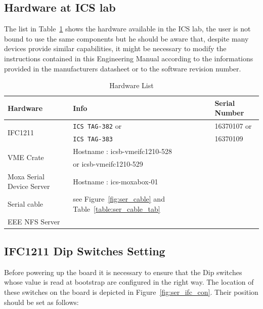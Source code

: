 \documentclass[11pt
  , a4paper
  , article
  , oneside
  , showtrims
]{memoir}
\begin{document}
\subsection{Hardware at ICS lab}
The list in Table~\ref{table:hwlist_ics} shows the hardware available in the ICS lab, the user is not bound to use the same components but he should be aware that, despite many devices provide similar capabilities, it might be necessary to modify the instructions contained in this Engineering Manual according to the informations provided in the manufacturers datasheet or to the software revision number.

\begin{table}[!hb]
  \centering
  \begin{tabular}{l|l|l}
    \toprule
    Hardware                  & Info                                                               & Serial Number              \\\midrule
    \multicolumn{1}{l|}{\multirow{2}{*}{IFC1211}}  & \texttt{ICS TAG-382} or                       & 16370107 or                \\
    \multicolumn{1}{l|}{}     & \texttt{ICS TAG-383}                                               & 16370109                   \\\midrule
    \multicolumn{1}{l|}{\multirow{2}{*}{VME Crate}}& Hostname : icsb-vmeifc1210-528                &                            \\
    \multicolumn{1}{l|}{}     & or icsb-vmeifc1210-529                                             &                            \\\midrule
    Moxa Serial Device Server & Hostname : ics-moxabox-01                                          &                            \\\midrule
    Serial cable              & see Figure~\ref{fig:ser_cable} and Table~\ref{table:ser_cable_tab} &                            \\\midrule
    EEE NFS Server            &                             &    \\\bottomrule
  \end{tabular}
  \caption[]{Hardware List}
  \label{table:hwlist_ics}
\end{table}
\FloatBarrier

\subsection{IFC1211 Dip Switches Setting}
Before powering up the board it is necessary to ensure that the Dip switches whose value is read at bootstrap are configured in the right way.
The location of these switches on the board is depicted in Figure~\ref{fig:ser_ifc_con}.
Their position should be set as follows:
\end{document}
